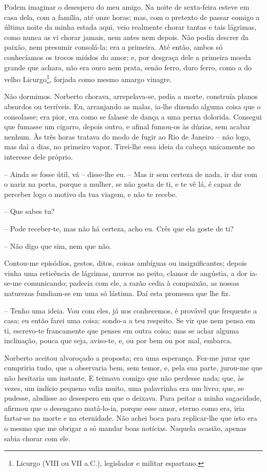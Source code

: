Podem imaginar o desespero do meu amigo. Na noite de sexta-feira esteve
em casa dela, com a família, até onze horas; mas, com o pretexto de
passar comigo a última noite da minha estada aqui, veio realmente chorar
tantas e tais lágrimas, como nunca as vi chorar jamais, nem antes nem
depois. Não podia descrer da paixão, nem presumir consolá-la; era a
primeira. Até então, ambos só conhecíamos os trocos miúdos do amor; e,
por desgraça dele a primeira moeda grande que achara, não era ouro nem
prata, senão ferro, duro ferro, como a do velho Licurgo\footnote{Licurgo
  (VIII ou VII a.C.), legislador e militar espartano.}, forjada como
mesmo amargo vinagre.

Não dormimos. Norberto chorava, arrepelava-se, pedia a morte, construía
planos absurdos ou terríveis. Eu, arranjando as malas, ia-lhe dizendo
alguma coisa que o consolasse; era pior, era como se falasse de dança a
uma perna dolorida. Consegui que fumasse um cigarro, depois outro, e
afinal fumou-os às dúzias, sem acabar nenhum. Às três horas tratava do
modo de fugir ao Rio de Janeiro -- não logo, mas daí a dias, no primeiro
vapor. Tirei-lhe essa ideia da cabeça unicamente no interesse dele
próprio.

-- Ainda se fosse útil, vá -- disse-lhe eu. -- Mas ir sem certeza de
nada, ir dar com o nariz na porta, porque a mulher, se não gosta de ti,
e te vê lá, é capaz de perceber logo o motivo da tua viagem, e não te
recebe.

-- Que sabes tu?

-- Pode receber-te, mas não há certeza, acho eu. Crês que ela goste de
ti?

-- Não digo que sim, nem que não.

Contou-me episódios, gestos, ditos, coisas ambíguas ou insignificantes;
depois vinha uma reticência de lágrimas, murros no peito, clamor de
angústia, a dor ia-se-me comunicando; padecia com ele, a razão cedia à
compaixão, as nossas naturezas fundiam-se em uma só lástima. Daí esta
promessa que lhe fiz.

-- Tenho uma ideia. Vou com eles, já nos conhecemos, é provável que
frequente a casa; eu então farei uma coisa: sondo-a a teu respeito. Se
vir que nem pensa em ti, escrevo-te francamente que penses em outra
coisa; mas se achar alguma inclinação, pouca que seja, aviso-te, e, ou
por bem ou por mal, embarca.

Norberto aceitou alvoroçado a proposta; era uma esperança. Fez-me jurar
que cumpriria tudo, que a observaria bem, sem temor, e, pela sua parte,
jurou-me que não hesitaria um instante. E teimava comigo que não
perdesse nada; que, às vezes, um indício pequeno valia muito, uma
palavrinha era um livro; que, se pudesse, aludisse ao desespero em que o
deixava. Para peitar a minha sagacidade, afirmou que o desengano
matá-lo-ia, porque esse amor, eterno como era, iria fartar-se na morte e
na eternidade. Não achei boca para replicar-lhe que isto era o mesmo que
me obrigar a só mandar boas notícias. Naquela ocasião, apenas sabia
chorar com ele.

